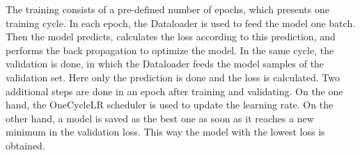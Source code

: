 The training consists of a pre-defined number of epochs, which presents one training cycle.
In each epoch, the Dataloader is used to feed the model one batch.
Then the model predicts, calculates the loss according to this prediction, and performs the back propagation to optimize the model.
In the same cycle, the validation is done, in which the Dataloader feeds the model samples of the validation set.
Here only the prediction is done and the loss is calculated.
Two additional steps are done in an epoch after training and validating.
On the one hand, the OneCycleLR scheduler \cite{pytorch_oneCycleLR_docu} is used to update the learning rate.
On the other hand, a model is saved as the best one as soon as it reaches a new minimum in the validation loss.
This way the model with the lowest loss is obtained.
